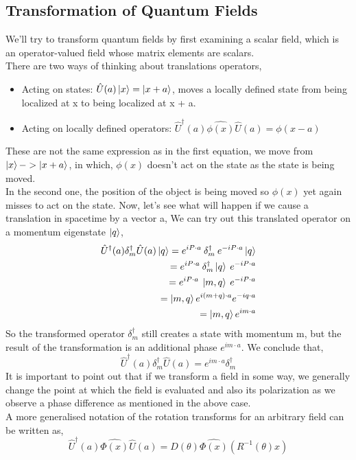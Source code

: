 \subsection{Transformation of Quantum Fields}
We’ll try to transform quantum fields by first examining a scalar field, which is an operator-valued field whose matrix elements are scalars. \\ 
There are two ways of thinking about translations operators,
\begin{itemize}
    \item Acting on states:  $\hat{U}(a) \ket{x} = \ket{x+a}$, moves a locally defined state from being localized at x to being localized at x + a.
   \item Acting on locally defined operators: $\hat{U}^{\dagger}(a) \hat{\phi(x)} \hat{U}(a)= \phi(x-a)$
\end{itemize}
These are not the same expression as in the first equation, we move from $\ket{x} -> \ket{x+a}$, in which, $\phi(x)$ doesn't act on the state as the state is being moved.  \\
In the second one, the position of the object is being moved so $\phi(x)$ yet again misses to act on the state. 
Now, let's see what will happen if we cause a translation in spacetime by a vector a, We can try out this translated operator on
a momentum eigenstate $\ket{q}$, 
\begin{eqnarray}
     \hat{U}^{\dagger}(a) \delta_{m}^{\dagger} \hat{U}(a)\ket{q} = e^{iP \cdot a} \: \delta_{m}^{\dagger} \: e^{-iP \cdot a} \ket{q} \\
      = e^{iP \cdot a} \: \delta_{m}^{\dagger}\ket{q} \: e^{-iP \cdot a} \\
      = e^{iP \cdot a} \: \ket{m,q} \: e^{-iP \cdot a} \\
      =  \ket{m,q} e^{i(m+q) \cdot a} e^{-iq \cdot a} \\
      = \ket{m,q}e^{im \cdot a}
\end{eqnarray}
So the transformed operator $\delta_{m}^{\dagger}$ still creates a state with momentum m, but the result of the transformation is an additional phase $e^{im \cdot a}$. We conclude that, 
\begin{equation}
    \hat{U}^{\dagger}(a) \delta_{m}^{\dagger} \hat{U}(a) = e^{im \cdot a} \delta_{m}^{\dagger}
\end{equation}
 It is  important to point out that if we transform a field in some
way, we generally change the point at which the field is evaluated and also its polarization as we observe a phase difference as mentioned in the above case. \\
A more generalised notation of the rotation transforms for an arbitrary field can be written as, 
\begin{equation}
    \hat{U}^{\dagger}(a) \hat{\Phi(x)} \hat{U}(a) = D(\theta) \hat{\Phi(x)} (R^{-1}(\theta)x)
\end{equation}
